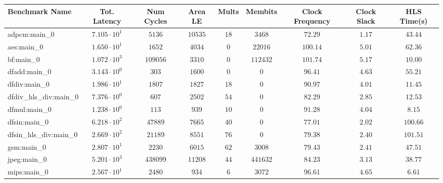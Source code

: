 \begin{tabular}{|l|c|c|c|c|c|c|c|c|}
\hline
Benchmark Name          & Tot. Latency           & Num Cycles & Area LE   & Mults   & Membits    & Clock Frequency & Clock Slack & HLS Time(s) \\
\hline
adpcm:main\_0           & $ 7.105 \cdot 10^{1} $ & $ 5136   $ & $ 10535 $ & $ 18  $ & $ 3468   $ & $ 72.29       $ & $ 1.17    $ & $ 43.44   $ \\
aes:main\_0             & $ 1.650 \cdot 10^{1} $ & $ 1652   $ & $ 4034  $ & $ 0   $ & $ 22016  $ & $ 100.14      $ & $ 5.01    $ & $ 62.36   $ \\
bf:main\_0              & $ 1.072 \cdot 10^{3} $ & $ 109056 $ & $ 3310  $ & $ 0   $ & $ 112432 $ & $ 101.74      $ & $ 5.17    $ & $ 10.00   $ \\
dfadd:main\_0           & $ 3.143 \cdot 10^{0} $ & $ 303    $ & $ 1600  $ & $ 0   $ & $ 0      $ & $ 96.41       $ & $ 4.63    $ & $ 55.21   $ \\
dfdiv:main\_0           & $ 1.986 \cdot 10^{1} $ & $ 1807   $ & $ 1827  $ & $ 18  $ & $ 0      $ & $ 90.97       $ & $ 4.01    $ & $ 11.45   $ \\
dfdiv\_hls\_div:main\_0 & $ 7.376 \cdot 10^{0} $ & $ 607    $ & $ 2502  $ & $ 54  $ & $ 0      $ & $ 82.29       $ & $ 2.85    $ & $ 12.53   $ \\
dfmul:main\_0           & $ 1.238 \cdot 10^{0} $ & $ 113    $ & $ 939   $ & $ 10  $ & $ 0      $ & $ 91.28       $ & $ 4.04    $ & $ 8.15    $ \\
dfsin:main\_0           & $ 6.218 \cdot 10^{2} $ & $ 47889  $ & $ 7665  $ & $ 40  $ & $ 0      $ & $ 77.01       $ & $ 2.02    $ & $ 100.66  $ \\
dfsin\_hls\_div:main\_0 & $ 2.669 \cdot 10^{2} $ & $ 21189  $ & $ 8551  $ & $ 76  $ & $ 0      $ & $ 79.38       $ & $ 2.40    $ & $ 101.51  $ \\
gsm:main\_0             & $ 2.807 \cdot 10^{1} $ & $ 2230   $ & $ 6015  $ & $ 62  $ & $ 3008   $ & $ 79.43       $ & $ 2.41    $ & $ 47.51   $ \\
jpeg:main\_0            & $ 5.201 \cdot 10^{3} $ & $ 438099 $ & $ 11208 $ & $ 44  $ & $ 441632 $ & $ 84.23       $ & $ 3.13    $ & $ 38.77   $ \\
mips:main\_0            & $ 2.567 \cdot 10^{1} $ & $ 2480   $ & $ 934   $ & $ 6   $ & $ 3072   $ & $ 96.61       $ & $ 4.65    $ & $ 6.61    $ \\

\end{tabular}
